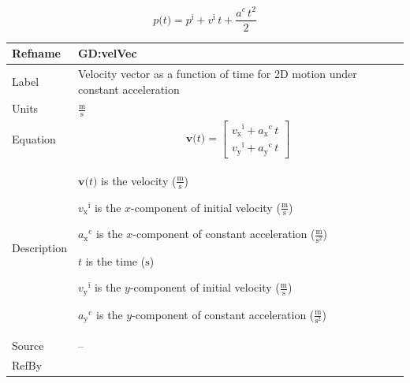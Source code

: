\documentclass[12pt]{article}
\begin{document}
\begin{displaymath}
p\text{(}t\text{)}={p^{\text{i}}}+{v^{\text{i}}}\,t+\frac{{a^{c}}\,t^{2}}{2}
\end{displaymath}
\medskip
\noindent
\begin{minipage}{\textwidth}
\begin{tabular}{>{\raggedright}p{}>{\raggedright\arraybackslash}p{}}
\toprule \textbf{Refname} & \textbf{GD:velVec}
\label{GD:velVec}
\\ \midrule
Label & Velocity vector as a function of time for 2D motion under constant acceleration
        
\\ \midrule
Units & $\frac{\text{m}}{\text{s}}$
        
\\ \midrule
Equation & \begin{displaymath}
           \symbf{v}\text{(}t\text{)}=\begin{bmatrix}
                                      {{v_{\text{x}}}^{\text{i}}}+{{a_{\text{x}}}^{\text{c}}}\,t\\
                                      {{v_{\text{y}}}^{\text{i}}}+{{a_{\text{y}}}^{\text{c}}}\,t
                                      \end{bmatrix}
           \end{displaymath}
\\ \midrule
Description & \begin{symbDescription}
              \item{$\symbf{v}\text{(}t\text{)}$ is the velocity ($\frac{\text{m}}{\text{s}}$)}
              \item{${{v_{\text{x}}}^{\text{i}}}$ is the $x$-component of initial velocity ($\frac{\text{m}}{\text{s}}$)}
              \item{${{a_{\text{x}}}^{\text{c}}}$ is the $x$-component of constant acceleration ($\frac{\text{m}}{\text{s}^{2}}$)}
              \item{$t$ is the time (${\text{s}}$)}
              \item{${{v_{\text{y}}}^{\text{i}}}$ is the $y$-component of initial velocity ($\frac{\text{m}}{\text{s}}$)}
              \item{${{a_{\text{y}}}^{\text{c}}}$ is the $y$-component of constant acceleration ($\frac{\text{m}}{\text{s}^{2}}$)}
              \end{symbDescription}
\\ \midrule
Source & --
         
\\ \midrule
RefBy & 
\\ \bottomrule
\end{tabular}
\end{minipage}
\end{document}

